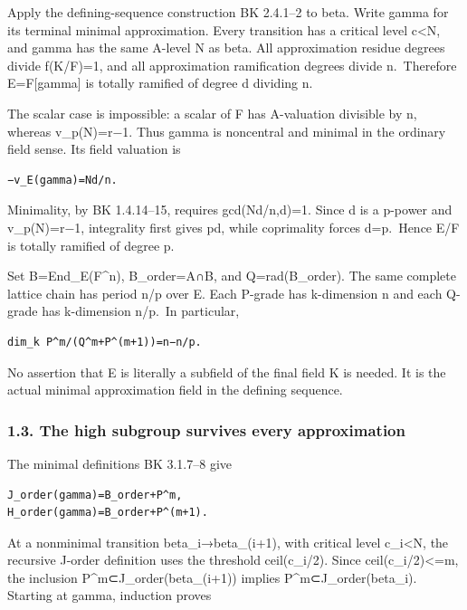 Apply the defining-sequence construction BK 2.4.1--2 to beta. Write
gamma for its terminal minimal approximation. Every transition has a
critical level c\textless N, and gamma has the same A-level N as beta.
All approximation residue degrees divide f(K/F)=1, and all approximation
ramification degrees divide n.~Therefore E=F{[}gamma{]} is totally
ramified of degree d dividing n.

The scalar case is impossible: a scalar of F has A-valuation divisible
by n, whereas v\_p(N)=r−1. Thus gamma is noncentral and minimal in the
ordinary field sense. Its field valuation is

\begin{Verbatim}[fontsize=\small,breaklines=true,breakanywhere=true]
−v_E(gamma)=Nd/n.
\end{Verbatim}

Minimality, by BK 1.4.14--15, requires gcd(Nd/n,d)=1. Since d is a
p-power and v\_p(N)=r−1, integrality first gives p\textbar d, while
coprimality forces d=p.~Hence E/F is totally ramified of degree p.

Set B=End\_E(F\^{}n), B\_order=A∩B, and Q=rad(B\_order). The same
complete lattice chain has period n/p over E. Each P-grade has
k-dimension n and each Q-grade has k-dimension n/p.~In particular,

\begin{Verbatim}[fontsize=\small,breaklines=true,breakanywhere=true]
dim_k P^m/(Q^m+P^(m+1))=n−n/p.
\end{Verbatim}

No assertion that E is literally a subfield of the final field K is
needed. It is the actual minimal approximation field in the defining
sequence.

\hypertarget{odd_capacity-the-high-subgroup-survives-every-approximation}{%
\subsubsection{1.3. The high subgroup survives every
approximation}\label{odd_capacity-the-high-subgroup-survives-every-approximation}}

The minimal definitions BK 3.1.7--8 give

\begin{Verbatim}[fontsize=\small,breaklines=true,breakanywhere=true]
J_order(gamma)=B_order+P^m,
H_order(gamma)=B_order+P^(m+1).
\end{Verbatim}

At a nonminimal transition beta\_i→beta\_(i+1), with critical level
c\_i\textless N, the recursive J-order definition uses the threshold
ceil(c\_i/2). Since ceil(c\_i/2)\textless=m, the inclusion
P\^{}m⊂J\_order(beta\_(i+1)) implies P\^{}m⊂J\_order(beta\_i). Starting
at gamma, induction proves

